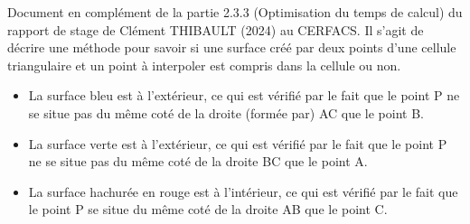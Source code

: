 \documentclass[11pt,a4paper]{report}
\begin{document}
Document en complément de la partie 2.3.3 (Optimisation du temps de calcul) du rapport de stage de Clément THIBAULT (2024) au CERFACS. Il s'agit de décrire une méthode pour savoir si une surface créé par deux points d'une cellule triangulaire et un point à interpoler est compris dans la cellule ou non.


\begin{itemize}
    \item La surface bleu est à l’extérieur, ce qui est vérifié par le fait que le point P ne se situe pas du même coté de la droite (formée par) AC que le point B.
    \item La surface verte est à l’extérieur, ce qui est vérifié par le fait que le point P ne se situe pas du même coté de la droite BC que le point A.
    \item La surface hachurée en rouge est à l'intérieur, ce qui est vérifié par le fait que le point P se situe du même coté de la droite AB que le point C.
\end{itemize}
\end{document}
